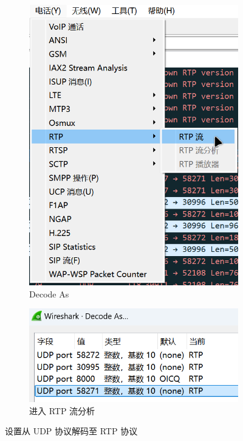 \documentclass[14pt,a4paper,UTF8,twoside]{article}
\begin{document}
\begin{figure}[H]
    \centering
    \begin{subfigure}[b]{0.25\textwidth}
        \centering
        \includegraphics[width=\textwidth]{lab5/tele.png}
        \caption{Decode As}
    \end{subfigure}
    \hspace{0.1\textwidth}
    \begin{subfigure}[b]{0.45\textwidth}
        \centering
        \includegraphics[width=\textwidth]{lab5/UDP2RTP.png}
        \caption{进入 RTP 流分析}
    \end{subfigure}

    \caption{设置从 UDP 协议解码至 RTP 协议}
    \label{fig:rtp_example}
\end{figure}
\end{document}
